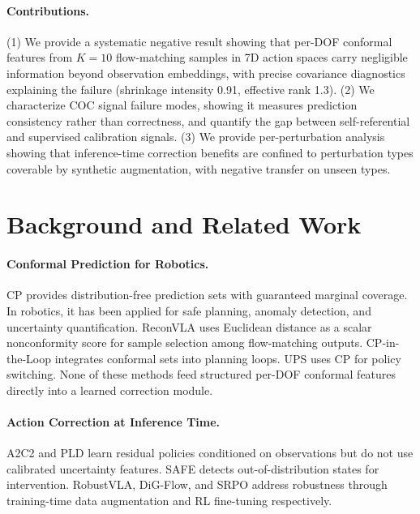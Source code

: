 \documentclass[letterpaper]{article}
\begin{document}
\paragraph{Contributions.}
(1) We provide a systematic negative result showing that per-DOF conformal features from $K{=}10$ flow-matching samples in 7D action spaces carry negligible information beyond observation embeddings, with precise covariance diagnostics explaining the failure (shrinkage intensity 0.91, effective rank 1.3).
(2) We characterize COC signal failure modes, showing it measures prediction consistency rather than correctness, and quantify the gap between self-referential and supervised calibration signals.
(3) We provide per-perturbation analysis showing that inference-time correction benefits are confined to perturbation types coverable by synthetic augmentation, with negative transfer on unseen types.

\section{Background and Related Work}
\label{sec:background}

\paragraph{Conformal Prediction for Robotics.}
CP provides distribution-free prediction sets with guaranteed marginal coverage. In robotics, it has been applied for safe planning, anomaly detection, and uncertainty quantification. ReconVLA uses Euclidean distance as a scalar nonconformity score for sample selection among flow-matching outputs. CP-in-the-Loop integrates conformal sets into planning loops. UPS uses CP for policy switching. None of these methods feed structured per-DOF conformal features directly into a learned correction module.

\paragraph{Action Correction at Inference Time.}
A2C2 and PLD learn residual policies conditioned on observations but do not use calibrated uncertainty features. SAFE detects out-of-distribution states for intervention. RobustVLA, DiG-Flow, and SRPO address robustness through training-time data augmentation and RL fine-tuning respectively.
\end{document}
